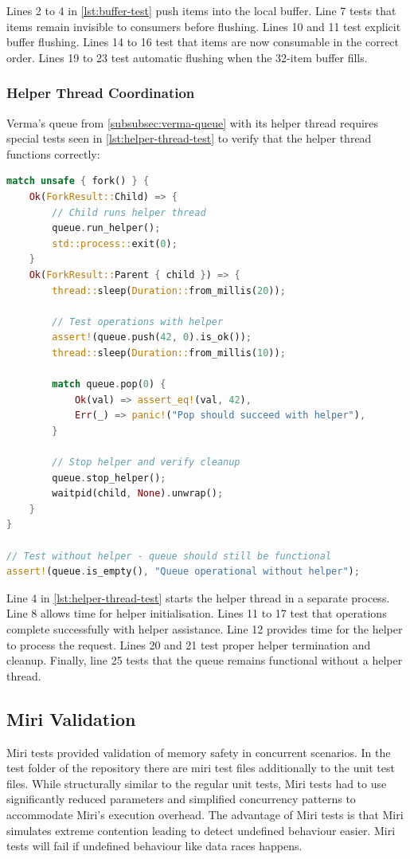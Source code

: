 Lines 2 to 4 in \cref{lst:buffer-test} push items into the local buffer. Line 7 tests that items remain invisible to consumers before flushing. Lines 10 and 11 test explicit buffer flushing. Lines 14 to 16 test that items are now consumable in the correct order. Lines 19 to 23 test automatic flushing when the 32-item buffer fills.

\subsubsection{Helper Thread Coordination}
Verma's queue from \cref{subsubsec:verma-queue} with its helper thread requires special tests seen in \cref{lst:helper-thread-test} to verify that the helper thread functions correctly:

\begin{lstlisting}[language=Rust, style=boxed, caption={Helper thread coordination test}, label={lst:helper-thread-test}]
match unsafe { fork() } {
    Ok(ForkResult::Child) => {
        // Child runs helper thread
        queue.run_helper();
        std::process::exit(0);
    }
    Ok(ForkResult::Parent { child }) => {
        thread::sleep(Duration::from_millis(20));
        
        // Test operations with helper
        assert!(queue.push(42, 0).is_ok());
        thread::sleep(Duration::from_millis(10));
        
        match queue.pop(0) {
            Ok(val) => assert_eq!(val, 42),
            Err(_) => panic!("Pop should succeed with helper"),
        }
        
        // Stop helper and verify cleanup
        queue.stop_helper();
        waitpid(child, None).unwrap();
    }
}

// Test without helper - queue should still be functional
assert!(queue.is_empty(), "Queue operational without helper");
\end{lstlisting}

Line 4 in \cref{lst:helper-thread-test} starts the helper thread in a separate process. Line 8 allows time for helper initialisation. Lines 11 to 17 test that operations complete successfully with helper assistance. Line 12 provides time for the helper to process the request. Lines 20 and 21 test proper helper termination and cleanup. Finally, line 25 tests that the queue remains functional without a helper thread.

\subsection{Miri Validation}\label{subsec:miri-validation}
Miri tests provided validation of memory safety in concurrent scenarios. In the test folder of the repository there are miri test files additionally to the unit test files. While structurally similar to the regular unit tests, Miri tests had to use significantly reduced parameters and simplified concurrency patterns to accommodate Miri's execution overhead. The advantage of Miri tests is that Miri simulates extreme contention leading to detect undefined behaviour easier. Miri tests will fail if undefined behaviour like data races happens.

